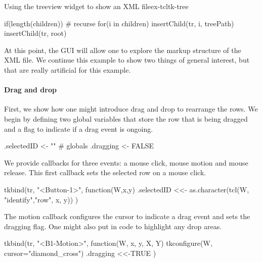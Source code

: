 \begin{example}{Using the treeview widget to show an XML file}{ex-tcltk-tree}
\begin{Schunk}
\begin{Sinput}
{   if(length(children))                          # recurse
     for(i in children) insertChild(tr, i, treePath)
 }
 insertChild(tr, root)
\end{Sinput}
\end{Schunk}
%
At this point, the GUI will allow one to explore the markup structure of the
XML file. We continue this example to show two things of general
interest, but that are really artificial for this example.


\paragraph{Drag and drop}
First, we show how one might introduce drag and drop to rearrange the
rows. We begin by defining two global variables that store the row
that is being dragged  and a flag to indicate if a drag event is ongoing.
\begin{Schunk}
\begin{Sinput}
 .selectedID <- ""                               # globals
 .dragging <- FALSE
\end{Sinput}
\end{Schunk}
We provide callbacks for three events: a mouse click, mouse motion and mouse release.
This first callback sets the selected row on a mouse click.
\begin{Schunk}
\begin{Sinput}
 tkbind(tr, "<Button-1>", function(W,x,y) {
   .selectedID <<- as.character(tcl(W, "identify","row", x, y))
 })  
\end{Sinput}
\end{Schunk}
The motion callback configures the cursor to indicate a drag event and sets
the dragging flag. One might also put in code to highlight
any drop areas.
\begin{Schunk}
\begin{Sinput}
 tkbind(tr, "<B1-Motion>", function(W, x, y, X, Y) {
   tkconfigure(W, cursor="diamond_cross")
   .dragging <<-TRUE
 })
\end{Sinput}
\end{Schunk}


\end{example}
